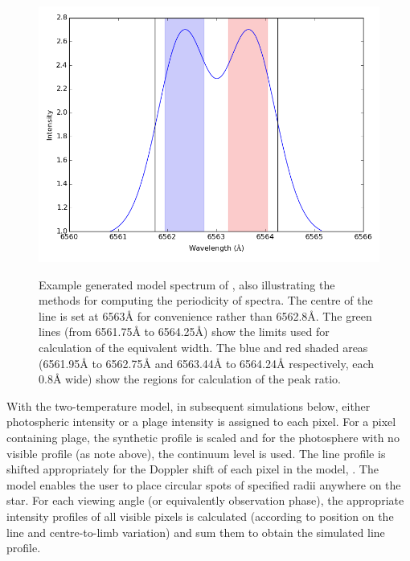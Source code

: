 \begin{figure}[!htbp]
\begin{center}
\includegraphics[scale=0.40]{Figures/integregions.png} \\
\end{center}
\caption{Example generated model spectrum of \prox, also illustrating the methods for computing the periodicity of
  spectra.  The centre of the \ha{} line is set at 6563{\AA} for convenience rather than 6562.8\AA{}.  The green lines
  (from 6561.75{\AA} to 6564.25\AA) show the limits used for calculation of the equivalent width. The blue and red
  shaded areas (6561.95{\AA} to 6562.75{\AA} and 6563.44{\AA} to 6564.24{\AA} respectively, each 0.8{\AA} wide) show the
  regions for calculation of the peak ratio.}
\protect\label{fig:integregions}
\end{figure}

With the two-temperature model, in subsequent simulations below, either photospheric intensity or a plage intensity is
assigned to each pixel. For a pixel containing plage, the synthetic {\ha} profile is scaled and for the photosphere with
no visible profile (as note above), the continuum level is used. The line profile is shifted appropriately for the
Doppler shift of each pixel in the model, . The
model enables the user to place circular spots of specified radii anywhere on the star. For each viewing angle (or
equivalently observation phase), the appropriate intensity profiles of all visible pixels is calculated (according to
position on the line and centre-to-limb variation) and sum them to obtain the simulated line profile.

